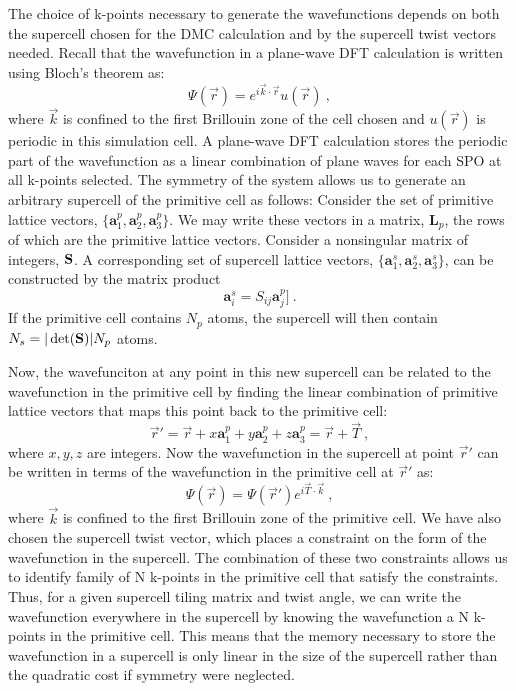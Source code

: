 The choice of k-points necessary to generate the wavefunctions depends on both the supercell chosen for the DMC calculation and by the supercell twist vectors needed.  Recall that the wavefunction in a plane-wave DFT calculation is written using Bloch's theorem as:
\begin{equation}
\Psi(\vec{r}) = e^{i\vec{k}\cdot\vec{r}}u(\vec{r})\:,
\end{equation}
where $\vec{k}$ is confined to the first Brillouin zone of the cell chosen and $u(\vec{r})$ is periodic in this simulation cell.  A plane-wave DFT calculation stores the periodic part of the wavefunction as a linear combination of plane waves for each SPO at all k-points selected.  The symmetry of the system allows us to generate an arbitrary supercell of the primitive cell as follows:  Consider the set of primitive lattice vectors, $ \{ \mathbf{a}^p_1, \mathbf{a}^p_2,
\mathbf{a}^p_3\} $.  We may write these vectors in a matrix, $\mathbf{L}_p$, the
rows of which are the primitive lattice vectors.  Consider a nonsingular
matrix of integers, $\mathbf{S}$.  A corresponding set of supercell lattice
vectors, $\{\mathbf{a}^s_1, \mathbf{a}^s_2, \mathbf{a}^s_3\}$, can be constructed by the matrix
product 
\begin{equation}
\mathbf{a}^s_i = S_{ij} \mathbf{a}^p_j]\:.
\end{equation}
If the primitive cell contains $N_p$ atoms, the supercell will then
contain $N_s = |\det(\mathbf{S})| N_p$ atoms.

Now, the wavefunciton at any point in this new supercell can be related to the wavefunction in the primitive cell by  finding the linear combination of primitive lattice vectors that maps this point back to the primitive cell:
\begin{equation}
\vec{r}' = \vec{r} + x \mathbf{a}^p_1 + y \mathbf{a}^p_2 + z\mathbf{a}^p_3 = \vec{r} + \vec{T}\:,
\end{equation}
where $x, y, z$ are integers.   Now the wavefunction in the supercell at point $\vec{r}'$ can be written in terms of the wavefunction in the primitive cell at $\vec{r}'$ as:
\begin{equation}
\Psi(\vec{r}) = \Psi(\vec{r}') e^{i \vec{T} \cdot \vec{k}}\:,
\end{equation}
where $\vec{k}$ is confined to the first Brillouin zone of the primitive cell.  We have also chosen the supercell twist vector, which places a constraint on the form of the wavefunction in the supercell.  The combination of these two constraints allows us to identify family of N k-points in the primitive cell that satisfy the constraints.  Thus, for a given supercell tiling matrix and twist angle, we can write the wavefunction everywhere in the supercell by knowing the wavefunction a N k-points in the primitive cell.  This means that the memory necessary to store the wavefunction in a supercell is only linear in the size of the supercell rather than the quadratic cost if symmetry were neglected.

